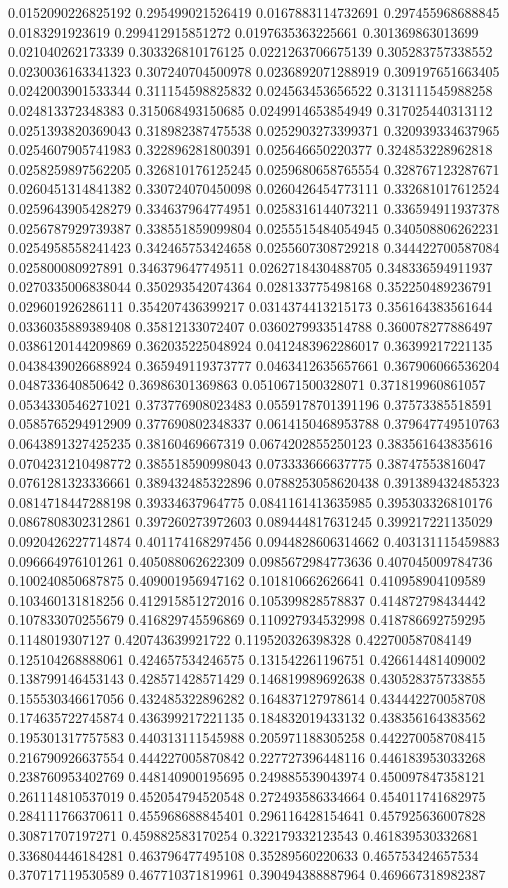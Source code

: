 \begin{table}
\begin{tabu}
\begin{sparkline}{10}
0.0152090226825192 0.295499021526419 0.0167883114732691 0.297455968688845 0.0183291923619 0.299412915851272 0.0197635363225661 0.301369863013699 0.021040262173339 0.303326810176125 0.0221263706675139 0.305283757338552 0.0230036163341323 0.307240704500978 0.0236892071288919 0.309197651663405 0.0242003901533344 0.311154598825832 0.024563453656522 0.313111545988258 0.024813372348383 0.315068493150685 0.0249914653854949 0.317025440313112 0.0251393820369043 0.318982387475538 0.0252903273399371 0.320939334637965 0.0254607905741983 0.322896281800391 0.025646650220377 0.324853228962818 0.0258259897562205 0.326810176125245 0.0259680658765554 0.328767123287671 0.0260451314841382 0.330724070450098 0.0260426454773111 0.332681017612524 0.0259643905428279 0.334637964774951 0.0258316144073211 0.336594911937378 0.0256787929739387 0.338551859099804 0.0255515484054945 0.340508806262231 0.0254958558241423 0.342465753424658 0.0255607308729218 0.344422700587084 0.025800080927891 0.346379647749511 0.0262718430488705 0.348336594911937 0.0270335006838044 0.350293542074364 0.028133775498168 0.352250489236791 0.029601926286111 0.354207436399217 0.0314374413215173 0.356164383561644 0.0336035889389408 0.35812133072407 0.0360279933514788 0.360078277886497 0.0386120144209869 0.362035225048924 0.0412483962286017 0.36399217221135 0.0438439026688924 0.365949119373777 0.0463412635657661 0.367906066536204 0.048733640850642 0.36986301369863 0.0510671500328071 0.371819960861057 0.0534330546271021 0.373776908023483 0.0559178701391196 0.37573385518591 0.0585765294912909 0.377690802348337 0.0614150468953788 0.379647749510763 0.0643891327425235 0.38160469667319 0.0674202855250123 0.383561643835616 0.0704231210498772 0.385518590998043 0.073333666637775 0.38747553816047 0.0761281323336661 0.389432485322896 0.0788253058620438 0.391389432485323 0.0814718447288198 0.39334637964775 0.0841161413635985 0.395303326810176 0.0867808302312861 0.397260273972603 0.089444817631245 0.399217221135029 0.0920426227714874 0.401174168297456 0.0944828606314662 0.403131115459883 0.096664976101261 0.405088062622309 0.0985672984773636 0.407045009784736 0.100240850687875 0.409001956947162 0.101810662626641 0.410958904109589 0.103460131818256 0.412915851272016 0.105399828578837 0.414872798434442 0.107833070255679 0.416829745596869 0.110927934532998 0.418786692759295 0.1148019307127 0.420743639921722 0.119520326398328 0.422700587084149 0.125104268888061 0.424657534246575 0.131542261196751 0.426614481409002 0.138799146453143 0.428571428571429 0.146819989692638 0.430528375733855 0.155530346617056 0.432485322896282 0.164837127978614 0.434442270058708 0.174635722745874 0.436399217221135 0.184832019433132 0.438356164383562 0.195301317757583 0.440313111545988 0.205971188305258 0.442270058708415 0.216790926637554 0.444227005870842 0.227727396448116 0.446183953033268 0.238760953402769 0.448140900195695 0.249885539043974 0.450097847358121 0.261114810537019 0.452054794520548 0.272493586334664 0.454011741682975 0.284111766370611 0.455968688845401 0.296116428154641 0.457925636007828 0.30871707197271 0.459882583170254 0.322179332123543 0.461839530332681 0.336804446184281 0.463796477495108 0.35289560220633 0.465753424657534 0.370717119530589 0.467710371819961 0.390494388887964 0.469667318982387 
\end{sparkline}
\end{tabu}
\end{table}

